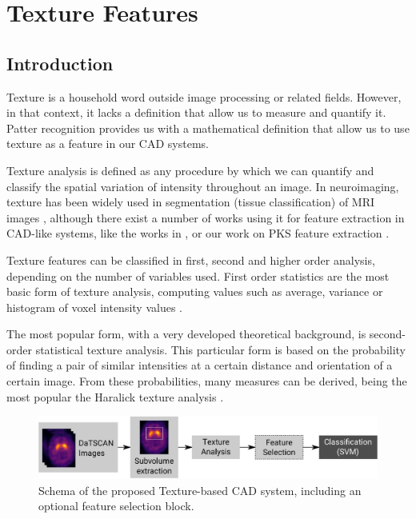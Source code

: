 \chapter{Texture Features}\label{ch:texture}
\section{Introduction}
Texture is a household word outside image processing or related fields. However, in that context, it lacks a definition that allow us to measure and quantify it. Patter recognition provides us with a mathematical definition that allow us to use texture as a feature in our \ac{CAD} systems. 

Texture analysis is defined as any procedure by which we can quantify and classify the spatial variation of intensity throughout an image. In neuroimaging, texture has been widely used in segmentation (tissue classification) of \ac{MRI} images \cite{Saeed2002,Alejo2003,Wang2009}, although there exist a number of works using it for feature extraction in \ac{CAD}-like systems, like the works in \cite{kovalev2001three,sikio2015mr}, or our work on \ac{PKS} feature extraction \cite{Martinez-Murcia2013266,martinez2014parametrization}. 

Texture features can be classified in first, second and higher order analysis, depending on the number of variables used. First order statistics \cite{Martinez-Murcia2016b} are the most basic form of texture analysis, computing values such as average, variance or histogram of voxel intensity values \cite{Srinivasan2008}. 

The most popular form, with a very developed theoretical background, is second-order statistical texture analysis. This particular form is based on the probability of finding a pair of similar intensities at a certain distance and orientation of a certain image. From these probabilities, many measures can be derived, being the most popular the Haralick texture analysis \cite{Haralick73}. 

\begin{figure}[htp]
\centering
\includegraphics[width=0.9\linewidth]{Graphics/ch5/01-flowdiagram}
\caption[Schema of the proposed Texture-based \acs{CAD} system.]{Schema of the proposed Texture-based \ac{CAD} system, including an optional feature selection block.}
\label{fig:textureCAD}
\end{figure}

